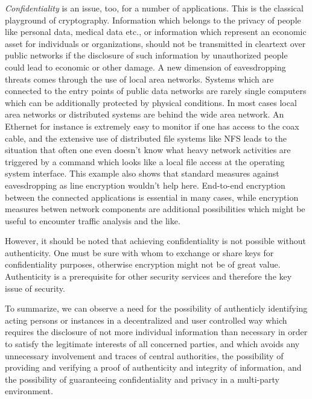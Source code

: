 {\em Confidentiality} is an issue, too, for a number of applications.
This is the classical playground of cryptography. Information which belongs
to the privacy of people like personal data, medical data etc., 
or information which represent an economic asset for individuals or organizations,
should not be transmitted in cleartext over public
networks if the disclosure of such information by unauthorized people
could lead to economic or other damage. 
A new dimension of eavesdropping threats comes through the use
of local area networks. Systems which are connected to the entry points
of public data networks are rarely single computers which can be additionally
protected by physical conditions. In most cases
local area networks or distributed systems are behind the wide area network.
An Ethernet for instance is extremely easy to monitor if one has access to
the coax cable, and the extensive use of distributed file systems like NFS
leads to the situation that often one even doesn't know what heavy
network activities are triggered by a command which looks like a local
file access at the operating system interface. This example also shows
that standard measures against eavesdropping as line encryption
wouldn't help here. End-to-end encryption between the connected applications 
is essential in many cases, while encryption measures betwen network
components are additional possibilities which might be useful to
encounter traffic analysis and the like.

However, it should be noted that achieving confidentiality is not possible without
authenticity. One must be sure with whom to exchange or share keys for confidentiality
purposes, otherwise encryption might not be of great value. Authenticity is a
prerequisite for other security services and therefore the key issue of security.

To summarize, we can observe a need for
\bi
\m the possibility of authenticly identifying acting persons or instances in 
   a decentralized and user controlled way which requires the disclosure of
   not more individual information than necessary in order to satisfy the legitimate
   interests of all concerned parties, and which avoids any unnecessary involvement
   and traces of central authorities,
\m the possibility of providing and verifying a proof of authenticity and integrity
   of information,
\m and the possibility of guaranteeing confidentiality and privacy in
   a multi-party environment.
\ei

